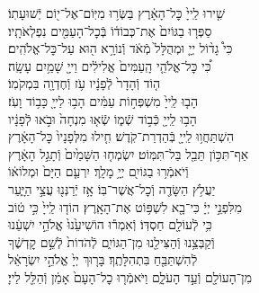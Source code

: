 \documentclass[twoside, openany, parskip=half, 11pt]{book}
\begin{document}
\begin{narrow}
שִׁ֤ירוּ לַֽייָ֙ כׇּל־הָאָ֔רֶץ \hfill בַּשְּׂר֥וּ מִיּֽוֹם־אֶל־י֖וֹם יְֿשׁוּעָתֽוֹ׃ \\
סַפְּר֤וּ בַגּוֹיִם֙ אֶת־כְּבוֹד֔וֹ \hfill בְּֿכׇל־הָעַמִּ֖ים נִפְלְאֹתָֽיו׃ \\
כִּי֩ גָד֨וֹל יְיָ֤ וּמְהֻלָּל֙ מְֿאֹ֔ד \hfill וְֿנוֹרָ֥א ה֖וּא עַל־כׇּל־אֱלֹהִֽים׃ \\
כִּ֠י כׇּל־אֱלֹהֵ֤י הָֽעַמִּים֙ אֱלִילִ֔ים \hfill וַייָ֖ שָׁמַ֥יִם עָשָֽׂה׃ \\
ה֤וֹד וְֿהָדָר֙ לְֿפָנָ֔יו \hfill עֹ֥ז וְֿחֶדְוָ֖ה בִּמְקֹמֽוֹ׃ \\
הָב֤וּ לַֽייָ֙ מִשְׁפְּח֣וֹת עַמִּ֔ים \hfill הָב֥וּ לַייָ֖ כָּב֥וֹד וָעֹֽז׃ \\
הָב֥וּ לַֽייָ֖ כְּֿב֣וֹד שְֿׁמ֑וֹ \hfill שְֿׂא֤וּ מִנְחָה֙ וּבֹ֣אוּ לְֿפָנָ֔יו\\ הִשְׁתַּחֲו֥וּ לַֽייָ֖ בְּֿהַדְרַת־קֹֽדֶשׁ׃ \hfill
חִ֤ילוּ מִלְּפָנָיו֙ כׇּל־הָאָ֔רֶץ\\ אַף־תִּכּ֥וֹן תֵּבֵ֖ל בַּל־תִּמּֽוֹט׃ \hfill
יִשְׂמְח֤וּ הַשָּׁמַ֙יִם֙ וְֿתָגֵ֣ל הָאָ֔רֶץ\\ וְֿיֹאמְֿר֥וּ בַגּוֹיִ֖ם יְיָ֥ מָלָֽךְ׃ \hfill
יִרְעַ֤ם הַיָּם֙ וּמְלוֹא֔וֹ\\ יַעֲלֹ֥ץ הַשָּׂדֶ֖ה וְֿכׇל־אֲשֶׁר־בּֽוֹ׃ \hfill
אָ֥ז יְֿרַנְּנ֖וּ עֲצֵ֣י הַיָּ֑עַר\\ מִלִּפְנֵ֣י יְיָ֔ כִּי־בָ֖א לִשְׁפּ֥וֹט אֶת־הָאָֽרֶץ׃ \hfill
הוֹד֤וּ לַֽייָ֙ כִּ֣י ט֔וֹב\\ כִּ֥י לְֿעוֹלָ֖ם חַסְדּֽוֹ׃ \hfill
וְֿאִמְר֕וּ הוֹשִׁיעֵ֙נוּ֙ אֱלֹהֵ֣י יִשְׁעֵ֔נוּ\\ וְֿקַבְּצֵ֥נוּ וְֿהַצִּילֵ֖נוּ מִן־הַגּוֹיִ֑ם \hfill לְֿהֹדוֹת֙ לְֿשֵׁ֣ם קׇדְשֶׁ֔ךָ\\ לְֿהִשְׁתַּבֵּ֖חַ בִּתְהִלָּתֶֽךָ׃ \hfill
בָּר֤וּךְ יְיָ֙ אֱלֹהֵ֣י יִשְׂרָאֵ֔ל\\ מִן־הָעוֹלָ֖ם וְֿעַ֣ד הָעֹלָ֑ם וַיֹּאמְֿר֤וּ כׇל־הָעָם֙ אָמֵ֔ן \hfill וְֿהַלֵּ֖ל לַייָ׃

\end{narrow}



\negline
\end{document}
